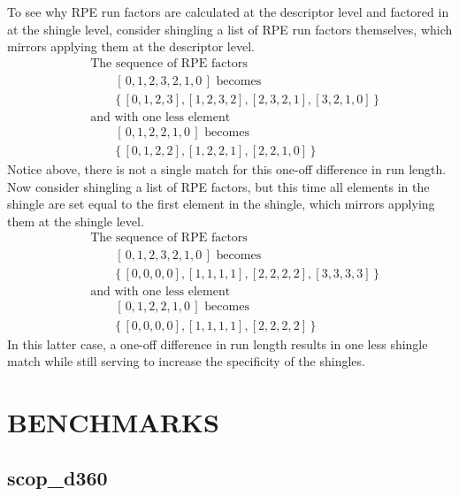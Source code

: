 \documentclass[letter,center,fleqn]{NAR}
\begin{document}
To see why RPE run factors are calculated at the descriptor level and factored in at the shingle level, consider shingling a list of RPE run factors themselves, which mirrors applying them at the descriptor level. 
\begin{align*}
    &\text{The sequence of RPE factors} \\
    &\qquad[\, 0, 1, 2, 3, 2, 1, 0 \,] \text{ becomes} \\
    &\qquad\{\, [0, 1, 2, 3], [1, 2, 3, 2], [2, 3, 2, 1], [3, 2, 1, 0] \,\} \\
    &\text{and with one less element} \\
    &\qquad[\, 0, 1, 2, 2, 1, 0 \,] \text{ becomes} \\
    &\qquad\{\, [0, 1, 2, 2], [1, 2, 2, 1], [2, 2, 1, 0] \,\}
\end{align*}
Notice above, there is not a single match for this one-off difference in run length.
Now consider shingling a list of RPE factors, but this time all elements in the shingle are set equal to the first element in the shingle, which mirrors applying them at the shingle level. 
\begin{align*}
    &\text{The sequence of RPE factors} \\
    &\qquad[\, 0, 1, 2, 3, 2, 1, 0 \,] \text{ becomes} \\
    &\qquad\{\, [0, 0, 0, 0], [1, 1, 1, 1], [2, 2, 2, 2], [3, 3, 3, 3] \,\} \\
    &\text{and with one less element} \\
    &\qquad[\, 0, 1, 2, 2, 1, 0 \,] \text{ becomes} \\
    &\qquad\{\, [0, 0, 0, 0], [1, 1, 1, 1], [2, 2, 2, 2] \,\}
\end{align*}
In this latter case, a one-off difference in run length results in one less shingle match while still serving to increase the specificity of the shingles. 

\newpage
\section{BENCHMARKS}

\subsection{scop\_d360}
\end{document}
